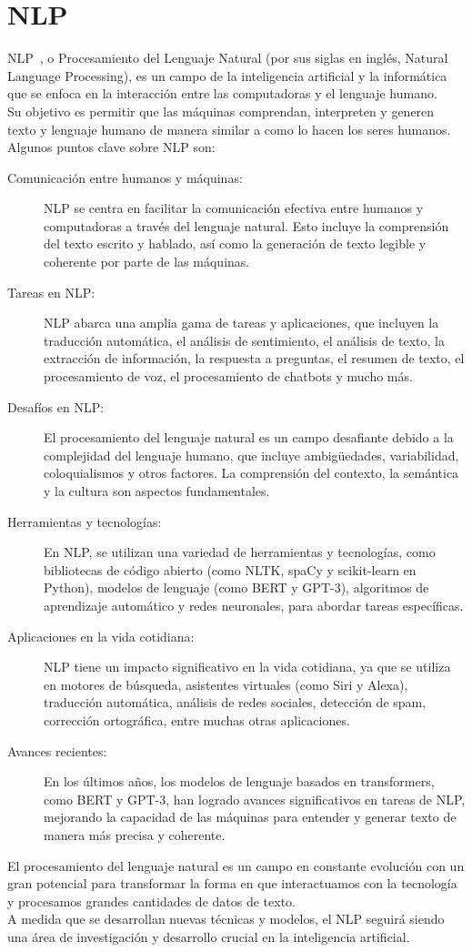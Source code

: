 \section{NLP}
NLP~\cite{nlp1}, o Procesamiento del Lenguaje Natural (por sus siglas en inglés, Natural Language Processing),
es un campo de la inteligencia artificial y la informática que se enfoca en la interacción
entre las computadoras y el lenguaje humano.\\
Su objetivo es permitir que las máquinas comprendan, interpreten y generen texto
y lenguaje humano de manera similar a como lo hacen los seres humanos.\\
Algunos puntos clave sobre NLP son:
\begin{description}
    \item[Comunicación entre humanos y máquinas:] NLP se centra en facilitar la comunicación efectiva entre humanos y computadoras a través del lenguaje natural. Esto incluye la comprensión del texto escrito y hablado, así como la generación de texto legible y coherente por parte de las máquinas.
    \item[Tareas en NLP:] NLP abarca una amplia gama de tareas y aplicaciones, que incluyen la traducción automática, el análisis de sentimiento, el análisis de texto, la extracción de información, la respuesta a preguntas, el resumen de texto, el procesamiento de voz, el procesamiento de chatbots y mucho más.
    \item[Desafíos en NLP:] El procesamiento del lenguaje natural es un campo desafiante debido a la complejidad del lenguaje humano, que incluye ambigüedades, variabilidad, coloquialismos y otros factores. La comprensión del contexto, la semántica y la cultura son aspectos fundamentales.
    \item[Herramientas y tecnologías:] En NLP, se utilizan una variedad de herramientas y tecnologías, como bibliotecas de código abierto (como NLTK, spaCy y scikit-learn en Python), modelos de lenguaje (como BERT y GPT-3), algoritmos de aprendizaje automático y redes neuronales, para abordar tareas específicas.
    \item[Aplicaciones en la vida cotidiana:] NLP tiene un impacto significativo en la vida cotidiana, ya que se utiliza en motores de búsqueda, asistentes virtuales (como Siri y Alexa), traducción automática, análisis de redes sociales, detección de spam, corrección ortográfica, entre muchas otras aplicaciones.
    \item[Avances recientes:] En los últimos años, los modelos de lenguaje basados en transformers, como BERT y GPT-3, han logrado avances significativos en tareas de NLP, mejorando la capacidad de las máquinas para entender y generar texto de manera más precisa y coherente.
\end{description}
El procesamiento del lenguaje natural es un campo en constante evolución 
con un gran potencial para transformar la forma en que interactuamos 
con la tecnología y procesamos grandes cantidades de datos de texto.\\
A medida que se desarrollan nuevas técnicas y modelos, 
el NLP seguirá siendo una área de investigación y desarrollo crucial en la inteligencia artificial.



